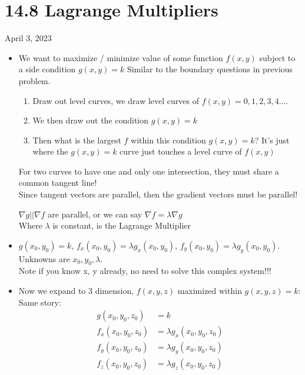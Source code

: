 \section{14.8 Lagrange Multipliers}
April 3, 2023
\begin{itemize}
	\item We want to maximize / minimize value of some function $f\left( x,y \right) $ subject to a side condition $g\left( x,y \right)  = k$ Similar to the boundary questions in previous problem.
		\begin{enumerate}
			\item Draw out level curves, we draw level curves of $f\left( x,y \right) = 0,1,2,3,4\ldots$.
			\item We then draw out the condition $g\left( x,y \right)  = k$
			\item Then what is the largest $f$ within this condition $g\left( x,y \right)  = k$? It's just where the $g\left( x,y \right)  = k$ curve just touches a level curve of $f\left( x,y \right) $
		\end{enumerate}
		For two curves to have one and only one intersection, they must share a common tangent line!\\
		Since tangent vectors are parallel, then the gradient vectors must be parallel!
		\begin{definition}
			$\nabla g || \nabla f$ are parallel, or we can say $\nabla f = \lambda \nabla g$\\
			Where $\lambda$ is constant, is the Lagrange Multiplier
		\end{definition}
	\item $g\left( x_0,y_0 \right) = k$, $f_x\left( x_0,y_0 \right)  = \lambda g_x\left( x_0,y_0 \right) $, $f_y\left( x_0,y_0 \right) = \lambda g_y\left( x_0,y_0 \right) $. Unknowns are $x_0,y_0,\lambda$.\\
		Note if you know x, y already, no need to solve this complex system!!!
	\item Now we expand to 3 dimension, $f\left( x,y,z \right) $ maximized within $g\left( x,y,z \right) = k$:\\
		Same story:
		\begin{align*}
			g\left( x_0,y_0,z_0 \right)  &= k \\
			f_x\left( x_0,y_0,z_0 \right) &= \lambda g_x\left( x_0,y_0,z_0 \right) \\
			f_y\left( x_0,y_0,z_0 \right) &= \lambda g_y\left( x_0,y_0,z_0 \right) \\
			f_z\left( x_0,y_0,z_0 \right) &= \lambda g_z\left( x_0,y_0,z_0 \right) \\

\end{align*}
\end{itemize}

